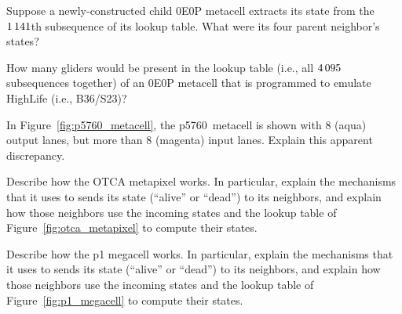 \begin{multicols}{2}
	\mfilbreak
	
	
	\begin{problemstar}\label{exer:0e0p_which_parent_states} 
		Suppose a newly-constructed child 0E0P metacell extracts its state from the $1{\,}141$th subsequence of its lookup table. What were its four parent neighbor's states?
	\end{problemstar}


	\mfilbreak
	
	
	\begin{problem}\label{exer:0e0p_highlife_how_many_lookup_table} 
		How many gliders would be present in the lookup table (i.e., all $4{\,}095$ subsequences together) of an 0E0P metacell that is programmed to emulate HighLife (i.e., B36/S23)?
	\end{problem}


	\mfilbreak


	\begin{problem}\label{exer:p5760_why_magenta} 
		In Figure~\ref{fig:p5760_metacell}, the p5760~metacell is shown with $8$ (aqua) output lanes, but more than $8$ (magenta) input lanes. Explain this apparent discrepancy.
	\end{problem}
	
	
	\mfilbreak
	
	
	\begin{problem}\label{exer:explain_otca_metapixel} 
		Describe how the OTCA metapixel works. In particular, explain the mechanisms that it uses to sends its state (``alive'' or ``dead'') to its neighbors, and explain how those neighbors use the incoming states and the lookup table of Figure~\ref{fig:otca_metapixel} to compute their states.
	\end{problem}


	\mfilbreak
	
	
	\begin{problem}\label{exer:explain_p1_megacell} 
		Describe how the p1 megacell works. In particular, explain the mechanisms that it uses to sends its state (``alive'' or ``dead'') to its neighbors, and explain how those neighbors use the incoming states and the lookup table of Figure~\ref{fig:p1_megacell} to compute their states.
	\end{problem}


	\mfilbreak
	

\end{multicols}
